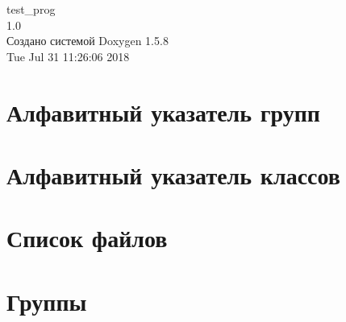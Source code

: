 \documentclass[a4paper]{book}
\begin{document}
\begin{titlepage}
\vspace*{7cm}
\begin{center}
{\Large test\_\-prog \\[1ex]\large 1.0 }\\
\vspace*{1cm}
{\large Создано системой Doxygen 1.5.8}\\
\vspace*{0.5cm}
{\small Tue Jul 31 11:26:06 2018}\\
\end{center}
\end{titlepage}
\clearemptydoublepage
{}
\tableofcontents
\clearemptydoublepage
{}
\chapter{Алфавитный указатель групп}

\chapter{Алфавитный указатель классов}

\chapter{Список файлов}

\chapter{Группы}


























\end{document}
